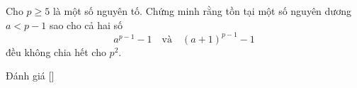 \ifshowproblem
\begin{problem}\label{problem:RUS-2015-TST-D7-P4}
    Cho \( p \geq 5 \) là một số nguyên tố.  
    Chứng minh rằng tồn tại một số nguyên dương \( a < p - 1 \) sao cho cả hai số 
    \[
        a^{p - 1} - 1 \quad \text{và} \quad (a + 1)^{p - 1} - 1
    \]
    đều không chia hết cho \( p^2 \).
\end{problem}
\fi

\ifshowinfo
Đánh giá [\textbf{}]\footnotemark
{}
\fi